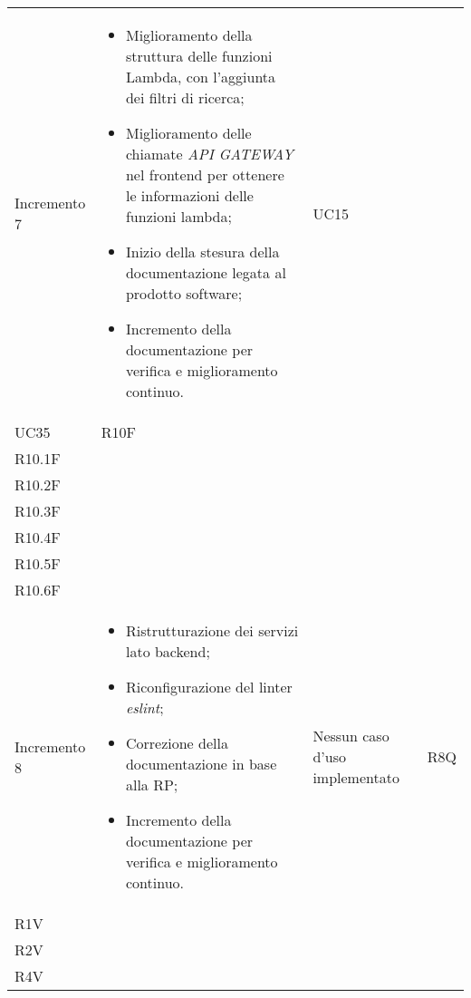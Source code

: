 \begin{longtable}{
    >{\centering}p{}
    >{\raggedright}p{}
    >{\centering}p{}
    >{\centering}p{}
    }
    Incremento 7                  &
    \vspace{-15px}
    \begin{itemize}
        \renewcommand\labelitemi{-}
        \item Miglioramento della struttura delle funzioni Lambda, con l'aggiunta dei filtri di ricerca;
        \item  Miglioramento delle chiamate \textit{API GATEWAY} nel frontend per ottenere le informazioni delle funzioni lambda;
        \item Inizio della stesura della documentazione legata al prodotto software;
        \item Incremento della documentazione per verifica e miglioramento continuo.
    \end{itemize}

                                  & UC15                                                                                                                                                                                     \\ UC35                                                                 & R10F                                                                                                       \\ R10.1F \\ R10.2F \\ R10.3F \\ R10.4F \\ R10.5F\\ R10.6F
    \tabularnewline

    Incremento 8
                                  &
    \vspace{-15px}
    \begin{itemize}
        \renewcommand\labelitemi{-}
        \item Ristrutturazione dei servizi lato backend;
        \item Riconfigurazione del linter \textit{eslint};
        \item Correzione della documentazione in base alla RP;
        \item Incremento della documentazione per verifica e miglioramento continuo.
    \end{itemize}
                                  & Nessun caso d'uso implementato                                              & R8Q                                                                                                        \\ R1V \\ R2V \\ R4V    \tabularnewline


\end{longtable}
